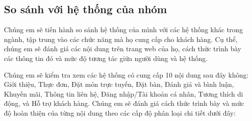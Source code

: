 \subsection{So sánh với hệ thống của nhóm}

Chúng em sẽ tiến hành so sánh hệ thống của mình với các hệ thống khác trong ngành, tập trung vào các chức năng mà họ cung cấp cho khách hàng. Cụ thể, chúng em sẽ đánh giá các nội dung trên trang web của họ, cách thức trình bày các thông tin đó và mức độ tương tác giữa người dùng và hệ thống.

Chúng em sẽ kiểm tra xem các hệ thống có cung cấp 10 nội dung sau đây không: Giới thiệu, Thực đơn, Đặt món trực tuyến, Đặt bàn, Đánh giá và bình luận, Khuyến mãi, Thông tin liên hệ, Đăng nhập/Tài khoản cá nhân, Tương thích di động, và Hỗ trợ khách hàng. Chúng em sẽ đánh giá cách thức trình bày và mức độ hoàn thiện của từng nội dung theo các cấp độ phân loại chi tiết dưới đây:

